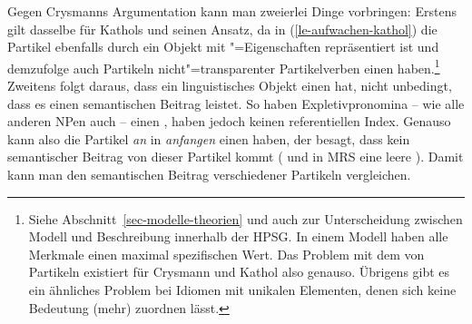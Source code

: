 Gegen Crysmanns Argumentation kann man zweierlei Dinge vorbringen: Erstens
gilt dasselbe für Kathols und seinen Ansatz, da in (\ref{le-aufwachen-kathol})
die Partikel ebenfalls durch ein Objekt mit "=Eigenschaften repräsentiert
ist und demzufolge auch Partikeln nicht"=transparenter Partikelverben einen \contw haben.\footnote{
Siehe Abschnitt~\ref{sec-modelle-theorien} und auch 
zur Unterscheidung zwischen Modell und Beschreibung innerhalb der HPSG. In einem
Modell haben alle Merkmale einen maximal spezifischen Wert. Das Problem mit dem
\contw von Partikeln existiert für Crysmann und Kathol also genauso. Übrigens gibt
es ein ähnliches Problem bei Idiomen mit unikalen Elementen, denen sich keine
Bedeutung (mehr) zuordnen lässt.%
} 
Zweitens folgt daraus, dass ein linguistisches Objekt einen \contw hat, nicht unbedingt, dass es einen semantischen
Beitrag leistet. So haben Expletivpronomina 
-- wie alle anderen NPen auch -- einen \contw, 
haben jedoch keinen referentiellen Index. Genauso kann also die
Partikel \emph{an} in \emph{anfangen} einen \contw haben, der besagt, dass kein
semantischer Beitrag von dieser Partikel kommt (\zb {} und in MRS eine leere \relsl).
Damit kann man den semantischen Beitrag verschiedener Partikeln vergleichen.

